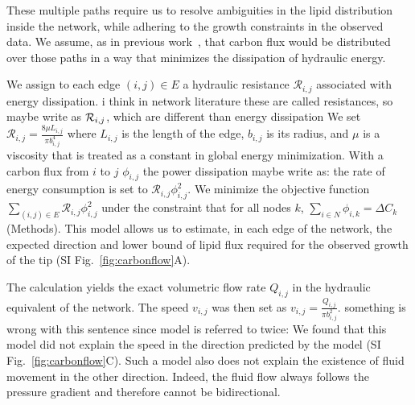 These multiple paths require us to resolve ambiguities in the lipid distribution inside the network, while adhering to the growth constraints in the observed data.
We assume, as in previous work~\cite{heaton_growth-induced_2010}, that carbon flux would be distributed over those paths in a way that minimizes the dissipation of hydraulic energy. 

We assign to each edge $(i,j)\in E$ a hydraulic resistance $\mathcal{R}_{i,j}$ associated with energy dissipation. {\color{blue} i think in network literature these are called resistances, so maybe write as ${\cal R}_{i,j}$, which are different than energy dissipation} We set $\mathcal{R}_{i,j} = \frac{8 \mu L_{i,j}}{\pi b_{i,j}^4}$ where $L_{i,j}$ is the length of the edge, $b_{i,j}$ is its radius, and $\mu$ is a viscosity that is treated as a constant in global energy minimization.
With a carbon flux from $i$ to $j$ $\phi_{i,j}$ the power dissipation {\color{blue} maybe write as: the rate of energy consumption} is set to $\mathcal{R}_{i,j} \phi_{i,j}^2$.
We minimize the objective function $\sum_{(i,j)\in E} \mathcal{R}_{i,j} \phi_{i,j}^2$ under the constraint that for all nodes $k$, $\sum_{i\in N} \phi_{i,k} = \Delta C_k$ (Methods).
This model allows us to estimate, in each edge of the network, the expected direction and lower bound of lipid flux required for the observed growth of the tip (SI Fig.~\ref{fig:carbonflow}A). 


The calculation  yields the exact volumetric flow rate $Q_{i,j}$ in the hydraulic equivalent of the network.
The speed $v_{i,j}$ was then set as $v_{i,j}=\frac{Q_{i,j}}{\pi b_{i,j}^2}$. {\color{blue} something is wrong with this sentence since model is referred to twice:} We found that this model did not explain the speed in the direction predicted by the model (SI Fig.~\ref{fig:carbonflow}C).
Such a model also does not explain the existence of fluid movement in the other direction.
Indeed, the fluid flow always follows the pressure gradient and therefore cannot be bidirectional.

